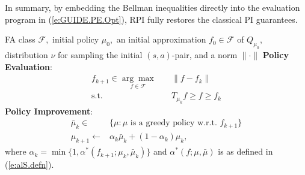 \documentclass[twoside]{article}
\theoremstyle{plain}
\theoremstyle{definition}
\theoremstyle{remark}
\newcommand{\mub}{\bar{\mu}}
\newcommand{\alS}{\alpha^*}
\newcommand{\CRPI}{CRPI}
\newcommand{\cF}{\mathcal{F}}
\renewcommand{\eqref}[1]{(\ref{#1})}
\begin{document}
In summary, by embedding the Bellman inequalities directly into the evaluation program in \eqref{e:GUIDE.PE.Opt}, RPI fully restores the classical PI guarantees.

\begin{algorithm}[t!]
   \caption{Conservative RPI (\CRPI)}
   \label{alg:CRPI}
\begin{algorithmic}
    FA class $\cF,$ initial policy $\mu_0,$ an initial approximation $f_0 \in \cF$ of $Q_{\mu_0},$ distribution $\nu$ for sampling the initial $(s, a)$-pair, and a norm $\|\cdot\|$ 
   \STATE \textbf{Policy Evaluation}:
    \begin{equation}
    \label{e:CRPI.PE.Opt}
        \begin{aligned}
            f_{k+1} \in  \underset{f \in \cF}{\arg\max} \quad & \|f - f_k\| \\
            \text{s.t.} \quad & T_{\mu_k} f  \geq f \geq f_k
        \end{aligned}
    \end{equation}
    \STATE \textbf{Policy Improvement}: 
    \begin{equation}
        \begin{aligned}
            \mub_{k} \in {} & \{\mu: \mu \text{ is a greedy policy w.r.t. } f_{k + 1} \} \\
            \mu_{k + 1} \leftarrow {} & \alpha_k \mub_k + (1 - \alpha_k) \mu_k,
        \end{aligned}
    \end{equation}
    where $\alpha_k = \min\{1, \alS(f_{k + 1}; \mu_k, \mub_k)\}$ and 
    $\alS(f; \mu, \mub)$ is as defined in \eqref{e:alS.defn}. 

\end{algorithmic}
\end{algorithm}
\end{document}
